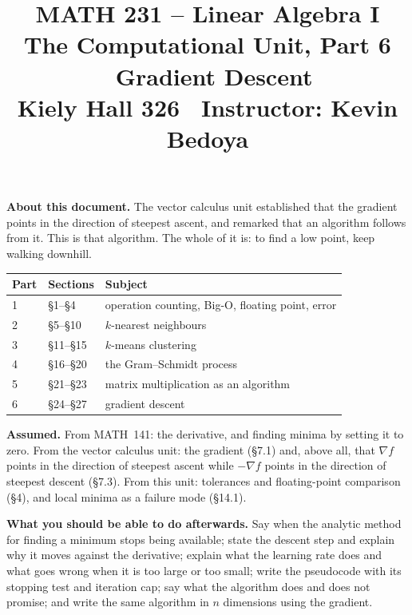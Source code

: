 \documentclass[11pt]{article}
\title{\vspace{-1.2cm}\textbf{\sffamily MATH 231 -- Linear Algebra I}\\[4pt]
       {\large\sffamily The Computational Unit, Part 6 \textbullet\
        Gradient Descent}\\[2pt]
       {\normalsize\sffamily Kiely Hall 326 \textbullet\
        Instructor: Kevin Bedoya}}
\author{}
\date{}
\theoremstyle{plain}
\theoremstyle{definition}
\theoremstyle{remark}
\newcommand{\grad}{\nabla}
\begin{document}
\setcounter{section}{23}  %
\maketitle
\vspace{-1.6cm}

\noindent\textbf{About this document.} The vector calculus unit established that
the gradient points in the direction of steepest ascent, and remarked that an
algorithm follows from it. This is that algorithm. The whole of it is: to find a
low point, keep walking downhill.

\begin{center}
\renewcommand{\arraystretch}{1.2}
\begin{tabular}{@{}l l l@{}}
\toprule
\textbf{Part} & \textbf{Sections} & \textbf{Subject} \\
\midrule
1 & \S1--\S4    & operation counting, Big-O, floating point, error \\
2 & \S5--\S10   & $k$-nearest neighbours \\
3 & \S11--\S15  & $k$-means clustering \\
4 & \S16--\S20  & the Gram--Schmidt process \\
5 & \S21--\S23  & matrix multiplication as an algorithm \\
6 & \S24--\S27  & gradient descent \\
\bottomrule
\end{tabular}
\end{center}

\medskip
\noindent\textbf{Assumed.} From MATH~141: the derivative, and finding minima by
setting it to zero. From the vector calculus unit: the gradient (\S7.1) and,
above all, that $\grad f$ points in the direction of steepest ascent while
$-\grad f$ points in the direction of steepest descent (\S7.3). From this unit:
tolerances and floating-point comparison (\S4), and local minima as a failure
mode (\S14.1).

\medskip
\noindent\textbf{What you should be able to do afterwards.} Say when the
analytic method for finding a minimum stops being available; state the descent
step and explain why it moves against the derivative; explain what the learning
rate does and what goes wrong when it is too large or too small; write the
pseudocode with its stopping test and iteration cap; say what the algorithm does
and does not promise; and write the same algorithm in $n$ dimensions using the
gradient.
\end{document}
